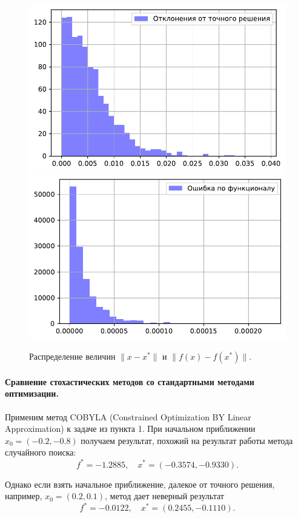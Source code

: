 \documentclass[16pt]{article}
\begin{document}
\begin{figure}[h]
	\center
	\includegraphics[scale=0.5]{7_2.pdf}
	\hfill
	\includegraphics[scale=0.5]{7_3.pdf}
	\caption{Распределение величин $\|x - x^*\|$ и $\|f(x) - f(x^*)\|$.}
\end{figure}
 
\paragraph{Сравнение стохастических методов со стандартными методами оптимизации.} Применим метод COBYLA (Constrained Optimization BY Linear Approximation) к задаче из пункта 1. При начальном приближении $x_0 = (-0.2, -0.8)$ получаем результат, похожий на результат работы метода случайного поиска:
$$f^* = -1.2885, \quad x^* = (-0.3574, -0.9330).$$

Однако если взять начальное приближение, далекое от точного решения, например, $x_0 = (0.2, 0.1)$, метод дает неверный результат 
$$f^* = -0.0122, \quad x^* = (0.2455, -0.1110).$$
\end{document}
